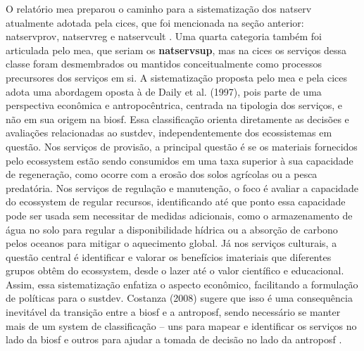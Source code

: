 \documentclass[./main.tex]{subfiles}
\begin{document}
\par O relatório \acrshort{mea} preparou o caminho para a sistematização dos \gls{natserv} atualmente adotada pela \acrfull{cices}, que foi mencionada na seção anterior: \gls{natservprov}, \gls{natservreg} e \gls{natservcult} \cite{Haines-young2018a}. Uma quarta categoria também foi articulada pelo \acrshort{mea}, que seriam os \textbf{\gls{natservsup}}, mas na \acrshort{cices} os serviços dessa classe foram desmembrados ou mantidos conceitualmente como processos precursores dos serviços em si. A sistematização proposta pelo \acrshort{mea} e pela \acrshort{cices} adota uma abordagem oposta à de Daily et al. (1997), pois parte de uma perspectiva econômica e antropocêntrica, centrada na tipologia dos serviços, e não em sua origem na \gls{biosf}. Essa classificação orienta diretamente as decisões e avaliações relacionadas ao \gls{sustdev}, independentemente dos ecossistemas em questão. Nos serviços de provisão, a principal questão é se os materiais fornecidos pelo ecos\gls{system} estão sendo consumidos em uma taxa superior à sua capacidade de regeneração, como ocorre com a erosão dos solos agrícolas ou a pesca predatória. Nos serviços de regulação e manutenção, o foco é avaliar a capacidade do ecos\gls{system} de regular recursos, identificando até que ponto essa capacidade pode ser usada sem necessitar de medidas adicionais, como o armazenamento de água no solo para regular a disponibilidade hídrica ou a absorção de carbono pelos oceanos para mitigar o aquecimento global. Já nos serviços culturais, a questão central é identificar e valorar os benefícios imateriais que diferentes grupos obtêm do ecos\gls{system}, desde o lazer até o valor científico e educacional. Assim, essa sistematização enfatiza o aspecto econômico, facilitando a formulação de políticas para o \gls{sustdev}. Costanza (2008) sugere que isso é uma consequência inevitável da transição entre a \gls{biosf} e a \gls{antroposf}, sendo necessário se manter mais de um \gls{system} de classificação -- uns para mapear e identificar os serviços no lado da \gls{biosf} e outros para ajudar a tomada de decisão no lado da \gls{antroposf} \cite{costanza2008}.
\end{document}
